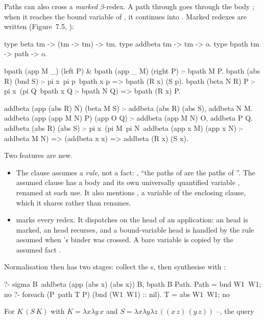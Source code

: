 {{Paths can also cross a \emph{marked} $\beta$-redex. A path through  goes through the body
; when it reaches the bound variable of , it continues into . Marked redexes are written
 (Figure~7.5, ):
\begin{lprolog}
type beta     tm -> (tm -> tm) -> tm.
type addbeta  tm -> tm -> o.
type bpath    tm -> path -> o.

bpath (app M _) (left P)  &
bpath (app _ M) (right P) :- bpath M P.
bpath (abs R)   (bnd S)   :- pi x\ pi p\ bpath x p =>
                                         bpath (R x) (S p).
bpath (beta N R) P :-
   pi x\ (pi Q\ bpath x Q :- bpath N Q) => bpath (R x) P.

addbeta (app (abs R) N) (beta M S) :- addbeta (abs R) (abs S),
                                      addbeta N M.
addbeta (app (app M N) P) (app O Q) :- addbeta (app M N) O,
                                       addbeta P Q.
addbeta (abs R) (abs S) :-
  pi x\ (pi M\ pi N\ addbeta (app x M) (app x N) :- addbeta M N) =>
        (addbeta x x) => addbeta (R x) (S x).
\end{lprolog}
Two features are new.
\begin{itemize}[nosep]
  \item The  clause assumes a \emph{rule}, not a fact: , \enquote{the
        paths of  are the paths of }. The assumed clause has a body and its own universally
        quantified variable , renamed at each use. It also mentions , a variable of the
        enclosing clause, which it shares rather than renames.
  \item {} marks every redex. It dispatches on the head of an application: an  head is
        marked, an  head recurses, and a bound-variable head  is handled by the rule assumed
        when 's binder was crossed. A bare variable is copied by the assumed fact .
\end{itemize}
Normalisation then has two stages: collect the s, then synthesise with  :
\begin{lprolog}
?- sigma B\ addbeta (app (abs x\x) (abs x\x)) B, bpath B Path.
Path = bnd W1\ W1;
no
?- foreach (P\ path T P) (bnd (W1\ W1) :: nil).
T = abs W1\ W1;
no
\end{lprolog}
For $K\,(S\,K)$ with $K=\lambda x\lambda y\,x$ and $S=\lambda x\lambda y\lambda z\,((x\,z)\,(y\,z))$
--, the query
\begin{lprolog}

\end{lprolog}}}
